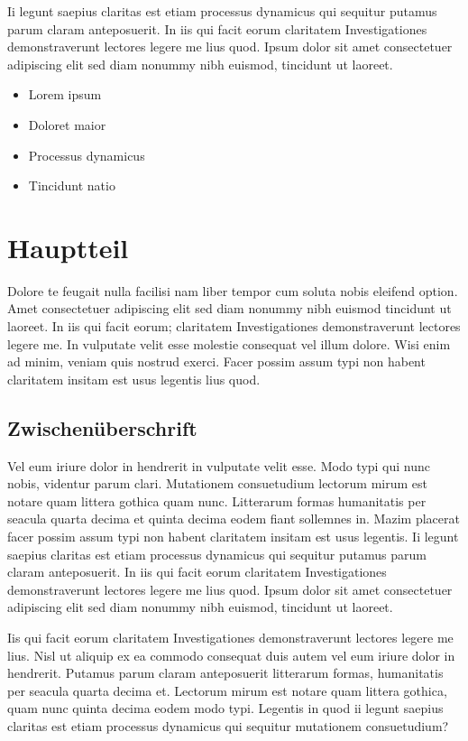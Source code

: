 \documentclass[a4paper,12pt]{scrartcl}
\begin{document}
 Ii legunt saepius claritas est etiam processus dynamicus qui sequitur putamus parum claram anteposuerit. In iis qui facit eorum claritatem Investigationes demonstraverunt lectores legere me lius quod. Ipsum dolor sit amet consectetuer adipiscing elit sed diam nonummy nibh euismod, tincidunt ut laoreet.
 
 
 \begin{itemize}
\item Lorem ipsum
\item Doloret maior
\item Processus dynamicus
\item Tincidunt natio

\end{itemize}



\section{Hauptteil}
Dolore te feugait nulla facilisi nam liber tempor cum soluta nobis eleifend option. Amet consectetuer adipiscing elit sed diam nonummy nibh euismod tincidunt ut laoreet. In iis qui facit eorum; claritatem Investigationes demonstraverunt lectores legere me. In vulputate velit esse molestie consequat vel illum dolore. Wisi enim ad minim, veniam quis nostrud exerci. Facer possim assum typi non habent claritatem insitam est usus legentis lius quod.

\subsection{Zwischenüberschrift}
Vel eum iriure dolor in hendrerit in vulputate velit esse. Modo typi qui nunc nobis, videntur parum clari. Mutationem consuetudium lectorum mirum est notare quam littera gothica quam nunc. Litterarum formas humanitatis per seacula quarta decima et quinta decima eodem fiant sollemnes in. Mazim placerat facer possim assum typi non habent claritatem insitam est usus legentis. Ii legunt saepius claritas est etiam processus dynamicus qui sequitur putamus parum claram anteposuerit. In iis qui facit eorum claritatem Investigationes demonstraverunt lectores legere me lius quod. Ipsum dolor sit amet consectetuer adipiscing elit sed diam nonummy nibh euismod, tincidunt ut laoreet.

Iis qui facit eorum claritatem Investigationes demonstraverunt lectores legere me lius. Nisl ut aliquip ex ea commodo consequat duis autem vel eum iriure dolor in hendrerit. Putamus parum claram anteposuerit litterarum formas, humanitatis per seacula quarta decima et. Lectorum mirum est notare quam littera gothica, quam nunc quinta decima eodem modo typi. Legentis in quod ii legunt saepius claritas est etiam processus dynamicus qui sequitur mutationem consuetudium?
\end{document}
